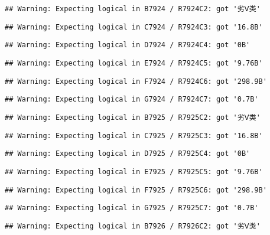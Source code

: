 \documentclass[
]{article}
\begin{document}
\begin{verbatim}
## Warning: Expecting logical in B7924 / R7924C2: got '劣Ⅴ类'
\end{verbatim}

\begin{verbatim}
## Warning: Expecting logical in C7924 / R7924C3: got '16.8B'
\end{verbatim}

\begin{verbatim}
## Warning: Expecting logical in D7924 / R7924C4: got '0B'
\end{verbatim}

\begin{verbatim}
## Warning: Expecting logical in E7924 / R7924C5: got '9.76B'
\end{verbatim}

\begin{verbatim}
## Warning: Expecting logical in F7924 / R7924C6: got '298.9B'
\end{verbatim}

\begin{verbatim}
## Warning: Expecting logical in G7924 / R7924C7: got '0.7B'
\end{verbatim}

\begin{verbatim}
## Warning: Expecting logical in B7925 / R7925C2: got '劣Ⅴ类'
\end{verbatim}

\begin{verbatim}
## Warning: Expecting logical in C7925 / R7925C3: got '16.8B'
\end{verbatim}

\begin{verbatim}
## Warning: Expecting logical in D7925 / R7925C4: got '0B'
\end{verbatim}

\begin{verbatim}
## Warning: Expecting logical in E7925 / R7925C5: got '9.76B'
\end{verbatim}

\begin{verbatim}
## Warning: Expecting logical in F7925 / R7925C6: got '298.9B'
\end{verbatim}

\begin{verbatim}
## Warning: Expecting logical in G7925 / R7925C7: got '0.7B'
\end{verbatim}

\begin{verbatim}
## Warning: Expecting logical in B7926 / R7926C2: got '劣Ⅴ类'
\end{verbatim}
\end{document}
